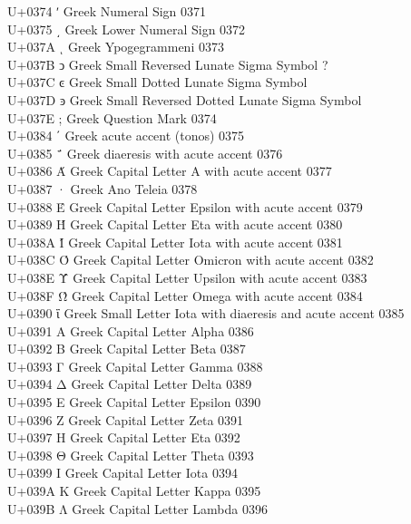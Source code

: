 \documentclass{article}
\begin{document}
U+0374  ʹ Greek Numeral Sign  0371\\
U+0375  ͵ Greek Lower Numeral Sign  0372\\
U+037A  ͺ Greek Ypogegrammeni 0373\\
U+037B  ͻ Greek Small Reversed Lunate Sigma Symbol  ?\\
U+037C  ͼ Greek Small Dotted Lunate Sigma Symbol\\
U+037D  ͽ Greek Small Reversed Dotted Lunate Sigma Symbol\\
U+037E  ; Greek Question Mark 0374\\
U+0384  ΄ Greek acute accent (tonos)  0375\\
U+0385  ΅ Greek diaeresis with acute accent 0376\\
U+0386  Ά Greek Capital Letter A with acute accent  0377\\
U+0387  · Greek Ano Teleia  0378\\
U+0388  Έ Greek Capital Letter Epsilon with acute accent  0379\\
U+0389  Ή Greek Capital Letter Eta with acute accent  0380\\
U+038A  Ί Greek Capital Letter Iota with acute accent 0381\\
U+038C  Ό Greek Capital Letter Omicron with acute accent  0382\\
U+038E  Ύ Greek Capital Letter Upsilon with acute accent  0383\\
U+038F  Ώ Greek Capital Letter Omega with acute accent  0384\\
U+0390  ΐ Greek Small Letter Iota with diaeresis and acute accent 0385\\
U+0391  Α Greek Capital Letter Alpha  0386\\
U+0392  Β Greek Capital Letter Beta 0387\\
U+0393  Γ Greek Capital Letter Gamma  0388\\
U+0394  Δ Greek Capital Letter Delta  0389\\
U+0395  Ε Greek Capital Letter Epsilon  0390\\
U+0396  Ζ Greek Capital Letter Zeta 0391\\
U+0397  Η Greek Capital Letter Eta  0392\\
U+0398  Θ Greek Capital Letter Theta  0393\\
U+0399  Ι Greek Capital Letter Iota 0394\\
U+039A  Κ Greek Capital Letter Kappa  0395\\
U+039B  Λ Greek Capital Letter Lambda 0396\\
\end{document}
